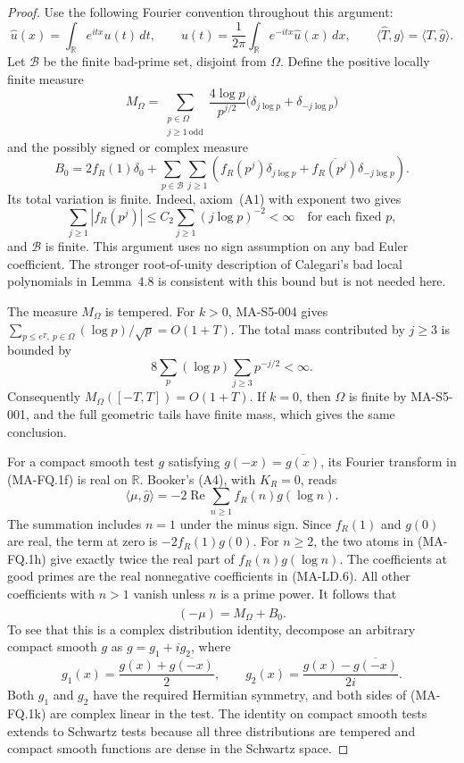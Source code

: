 \begin{proof}
Use the following Fourier convention throughout this argument:
\[
 \widehat u(x)=\int_{\mathbb R}e^{itx}u(t)\,dt,
 \qquad
 u(t)=\frac1{2\pi}\int_{\mathbb R}e^{-itx}\widehat u(x)\,dx,
 \qquad
 \langle\widehat T,g\rangle=\langle T,\widehat g\rangle.
 \tag{MA-FQ.1f}
\]
Let $\mathcal B$ be the finite bad-prime set, disjoint from
$\Omega$. Define the positive locally finite measure
\[
 M_\Omega=\sum_{\substack{p\in\Omega\\j\ge1\ \mathrm{odd}}}
 \frac{4\log p}{p^{j/2}}
   \bigl(\delta_{j\log p}+\delta_{-j\log p}\bigr)
 \tag{MA-FQ.1g}
\]
and the possibly signed or complex measure
\[
 B_0=2f_R(1)\delta_0+
 \sum_{p\in\mathcal B}\sum_{j\ge1}
 \left(f_R(p^j)\delta_{j\log p}
       +\overline{f_R(p^j)}\delta_{-j\log p}\right).
 \tag{MA-FQ.1h}
\]
Its total variation is finite. Indeed, axiom~(A1) with exponent
two gives
\[
 \sum_{j\ge1}|f_R(p^j)|
 \le C_2\sum_{j\ge1}(j\log p)^{-2}<\infty
 \quad\text{for each fixed }p,
 \tag{MA-FQ.1i}
\]
and $\mathcal B$ is finite. This argument uses no sign assumption
on any bad Euler coefficient. The stronger root-of-unity
description of Calegari's bad local polynomials in Lemma~4.8
is consistent with this bound but is not needed here.

The measure $M_\Omega$ is tempered. For $k>0$, MA-S5-004 gives
$\sum_{p\le e^T,\ p\in\Omega}(\log p)/\sqrt p=O(1+T)$.
The total mass contributed by $j\ge3$ is bounded by
\[
 8\sum_p(\log p)\sum_{j\ge3}p^{-j/2}<\infty.
\]
Consequently $M_\Omega([-T,T])=O(1+T)$. If $k=0$, then
$\Omega$ is finite by MA-S5-001, and the full geometric tails
have finite mass, which gives the same conclusion.

For a compact smooth test $g$ satisfying
$g(-x)=\overline{g(x)}$, its Fourier transform in (MA-FQ.1f)
is real on $\mathbb R$. Booker's (A4), with $K_R=0$, reads
\[
 \langle\mu,\widehat g\rangle
 =-2\operatorname{Re}\sum_{n\ge1}f_R(n)g(\log n).
 \tag{MA-FQ.1j}
\]
The summation includes $n=1$ under the minus sign. Since
$f_R(1)$ and $g(0)$ are real, the term at zero is
$-2f_R(1)g(0)$. For $n\ge2$, the two atoms in (MA-FQ.1h)
give exactly twice the real part of $f_R(n)g(\log n)$.
The coefficients at good primes are the real nonnegative
coefficients in (MA-LD.6). All other coefficients with $n>1$
vanish unless $n$ is a prime power. It follows that
\[
                  \widehat{(-\mu)}=M_\Omega+B_0.
 \tag{MA-FQ.1k}
\]
To see that this is a complex distribution identity, decompose
an arbitrary compact smooth $g$ as $g=g_1+ig_2$, where
\[
 g_1(x)=\frac{g(x)+\overline{g(-x)}}2,
 \qquad
 g_2(x)=\frac{g(x)-\overline{g(-x)}}{2i}.
\]
Both $g_1$ and $g_2$ have the required Hermitian symmetry, and
both sides of (MA-FQ.1k) are complex linear in the test.
The identity on compact smooth tests extends to Schwartz tests
because all three distributions are tempered and compact
smooth functions are dense in the Schwartz space.


\end{proof}
